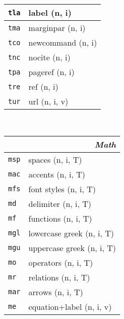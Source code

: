 \documentclass[oneside,10pt,landscape,DIV16]{scrartcl}
\newcommand{\Map}[1] {\textbf{\textasciiacute}\texttt{#1}}
\begin{document}
\begin{multicols}{3}
\begin{center}
\begin{tabular}[]{|p{11mm}|p{60mm}|}
\hline \Map{tla}  & label                          \hfill (n, i)\\
\hline \Map{tma}  & marginpar                      \hfill (n, i)\\
\hline \Map{tco}  & newcommand                     \hfill (n, i)\\
\hline \Map{tnc}  & nocite                         \hfill (n, i)\\
\hline \Map{tpa}  & pageref                        \hfill (n, i)\\
\hline \Map{tre}  & ref                            \hfill (n, i)\\
\hline \Map{tur}  & url                            \hfill (n, i, v)\\
\hline
%
\end{tabular}\\
%
\begin{tabular}[]{|p{11mm}|p{62mm}|}
\hline
\multicolumn{2}{|r|}{\textsl{\textbf{M}ath}}  \\[1.0ex]
\hline  \Map{msp} & spaces                    \hfill (n, i, T)\\
\hline  \Map{mac} & accents                   \hfill (n, i, T)\\
\hline  \Map{mfs} & font styles               \hfill (n, i, T)\\
\hline  \Map{md}  & delimiter                 \hfill (n, i, T)\\
\hline  \Map{mf}  & functions                 \hfill (n, i, T)\\
\hline  \Map{mgl} & lowercase  greek          \hfill (n, i, T)\\
\hline  \Map{mgu} & uppercase greek           \hfill (n, i, T)\\
\hline  \Map{mo}  & operators                 \hfill (n, i, T)\\
\hline  \Map{mr}  & relations                 \hfill (n, i, T)\\
\hline  \Map{mar} & arrows                    \hfill (n, i, T)\\
\hline
\hline  \Map{me}  & equation+label            \hfill (n, i, v)\\

\end{tabular}
\end{center}
\end{multicols}
\end{document}
